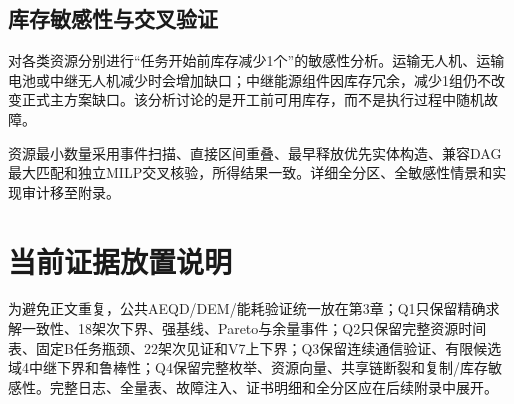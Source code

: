 \documentclass[UTF8,a4paper,12pt]{ctexart}
\begin{document}
\subsection{库存敏感性与交叉验证}

对各类资源分别进行“任务开始前库存减少1个”的敏感性分析。运输无人机、运输电池或中继无人机减少时会增加缺口；中继能源组件因库存冗余，减少1组仍不改变正式主方案缺口。该分析讨论的是开工前可用库存，而不是执行过程中随机故障。

资源最小数量采用事件扫描、直接区间重叠、最早释放优先实体构造、兼容DAG最大匹配和独立MILP交叉核验，所得结果一致。详细全分区、全敏感性情景和实现审计移至附录。

\section*{当前证据放置说明}

为避免正文重复，公共AEQD/DEM/能耗验证统一放在第3章；Q1只保留精确求解一致性、18架次下界、强基线、Pareto与余量事件；Q2只保留完整资源时间表、固定B任务瓶颈、22架次见证和V7上下界；Q3保留连续通信验证、有限候选域4中继下界和鲁棒性；Q4保留完整枚举、资源向量、共享链断裂和复制/库存敏感性。完整日志、全量表、故障注入、证书明细和全分区应在后续附录中展开。
\end{document}
